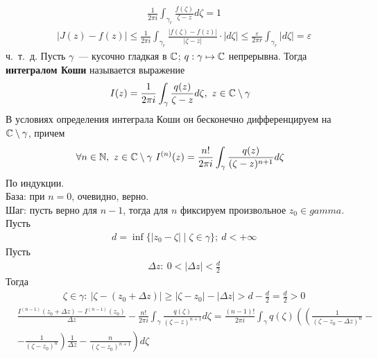 \begin{align*}
  & \frac{1}{2 \pi i} \int_{\gamma_r} \frac{f(\zeta)}{\zeta - z} d \zeta = 1
\end{align*}
\begin{align*}
  & \left| J(z) - f(z) \right| \leq \frac{1}{2 \pi i} \int_{\gamma_r} \frac{\left| f(\zeta) - f(z) \right|}{\left| \zeta - z \right|} \cdot \left| d\zeta \right| \leq \frac{\varepsilon}{2 \pi r} \int_{\gamma_r}\left| d\zeta \right| = \varepsilon
\end{align*}
ч.~т.~д.
\Def
Пусть $\gamma$~--- кусочно гладкая в $\mathbb{C}$; $q: \gamma \mapsto \mathbb{C}$ непрерывна.
Тогда \textbf{интегралом Коши} называется выражение
\begin{equation} \label{(8.2)}
    I(z) = \frac{1}{2 \pi i} \int_{\gamma} \frac{q(z)}{\zeta - z} d\zeta, \ z \in \mathbb{C} \setminus \gamma
\end{equation}
\theorem
В условиях определения интеграла Коши он бесконечно дифференцируем на
$\mathbb{C}\setminus\gamma$, причем
\begin{equation} \label{(8.3)}
    \forall n \in \mathbb{N}, \  z \in \mathbb{C} \setminus \gamma \ I^{(n)}(z) = \frac{n!}{2 \pi i} \int_{\gamma} \frac{q(z)}{(\zeta - z)^{n+1}} d\zeta
\end{equation}
\pr
По индукции.
\\
База: при $n=0$, очевидно, верно.
\\
Шаг: пусть верно для $n-1$, тогда для $n$ фиксируем произвольное $z_0 \in
gamma$.
\\
Пусть
\begin{align*}
  & d = \inf\{\left| z_0 - \zeta \right| \mid \zeta \in \gamma\}; \ d < +\infty
\end{align*}
Пусть
\begin{align*}
  & \Delta z: \ 0 < \left| \Delta z \right| < \frac{d}{2}
\end{align*}
Тогда
\begin{align*}
  & \zeta \in \gamma: \ \left| \zeta - (z_0+\Delta z)\right| \geq \left| \zeta - z_0 \right| - \left| \Delta z \right| > d - \frac{d}{2} = \frac{d}{2} > 0
\end{align*}
\begin{align*}
  & \frac{I^{(n-1)}(z_0+\Delta z) - I^{(n-1)}(z_0)}{\Delta z} - \frac{n!}{2 \pi i}\int_{\gamma}\frac{q(\zeta)}{(\zeta-z)^{n+1}}d\zeta = \frac{(n-1)!}{2 \pi i}\int_{\gamma}q(\zeta)\left( \left( \frac{1}{(\zeta-z_0-\Delta z)^n} - \right. \right.\\
  & \left. \left. - \frac{1}{(\zeta-z_0)^n} \right)\frac{1}{\Delta z} - \frac{n}{(\zeta-z_0)^{n+1}}\right)d\zeta
\end{align*}
